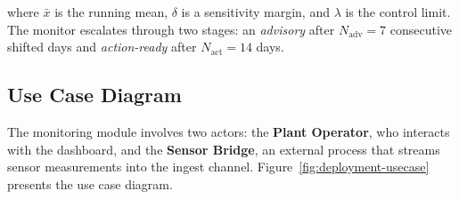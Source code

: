 where $\bar{x}$ is the running mean, $\delta$ is a sensitivity margin, and $\lambda$ is the control limit. The monitor escalates through two stages: an \emph{advisory} after $N_{\mathrm{adv}} = 7$ consecutive shifted days and \emph{action-ready} after $N_{\mathrm{act}} = 14$ days.

\subsection{Use Case Diagram}
\label{sec:deployment-usecase}

The monitoring module involves two actors: the \textbf{Plant Operator}, who interacts with the dashboard, and the \textbf{Sensor Bridge}, an external process that streams sensor measurements into the ingest channel. Figure~\ref{fig:deployment-usecase} presents the use case diagram.

